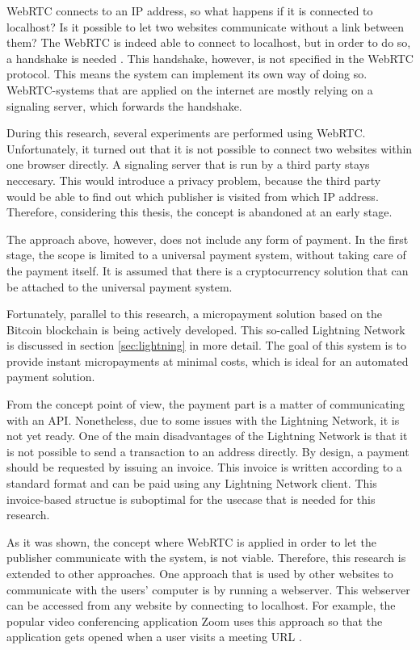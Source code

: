 WebRTC connects to an IP address, so what happens if it is connected to localhost? Is it possible to let two websites communicate without a link between them? The WebRTC is indeed able to connect to localhost, but in order to do so, a handshake is needed \cite{dutton2013webrtc}. This handshake, however, is not specified in the WebRTC protocol. This means the system can implement its own way of doing so. WebRTC-systems that are applied on the internet are mostly relying on a signaling server, which forwards the handshake. 

During this research, several experiments are performed using WebRTC. Unfortunately, it turned out that it is not possible to connect two websites within one browser directly. A signaling server that is run by a third party stays neccesary. This would introduce a privacy problem, because the third party would be able to find out which publisher is visited from which IP address. Therefore, considering this thesis, the concept is abandoned at an early stage.

The approach above, however, does not include any form of payment. In the first stage, the scope is limited to a universal payment system, without taking care of the payment itself. It is assumed that there is a cryptocurrency solution that can be attached to the universal payment system.

Fortunately, parallel to this research, a micropayment solution based on the Bitcoin blockchain is being actively developed. This so-called Lightning Network is discussed in section \ref{sec:lightning} in more detail. The goal of this system is to provide instant micropayments at minimal costs, which is ideal for an automated payment solution.

From the concept point of view, the payment part is a matter of communicating with an API. Nonetheless, due to some issues with the Lightning Network, it is not yet ready. One of the main disadvantages of the Lightning Network is that it is not possible to send a transaction to an address directly. By design, a payment should be requested by issuing an invoice. This invoice is written according to a standard format and can be paid using any Lightning Network client. This invoice-based structue is suboptimal for the usecase that is needed for this research.

As it was shown, the concept where WebRTC is applied in order to let the publisher communicate with the system, is not viable. Therefore, this research is extended to other approaches. One approach that is used by other websites to communicate with the users' computer is by running a webserver. This webserver can be accessed from any website by connecting to localhost. For example, the popular video conferencing application Zoom uses this approach so that the application gets opened when a user visits a meeting URL \cite{zoomwebserver}.

